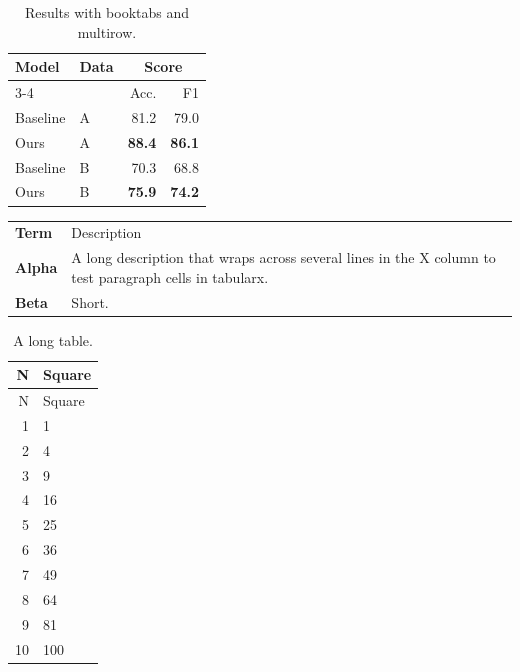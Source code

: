 \documentclass{article}
\begin{document}
\begin{table}[ht]\centering
\caption{Results with booktabs and multirow.}
\begin{tabular}{llrr}
\toprule
\multirow{2}{*}{Model} & \multirow{2}{*}{Data} & \multicolumn{2}{c}{Score} \\
\cmidrule(lr){3-4} & & Acc. & F1 \\
\midrule
Baseline & A & 81.2 & 79.0 \\
Ours & A & \textbf{88.4} & \textbf{86.1} \\
\addlinespace
Baseline & B & 70.3 & 68.8 \\
Ours & B & \textbf{75.9} & \textbf{74.2} \\
\bottomrule
\end{tabular}
\end{table}
\begin{tabularx}{\linewidth}{>{\bfseries}lX}
\rowcolor{gray!20} Term & Description \\
Alpha & A long description that wraps across several lines in the X column to test paragraph cells in tabularx. \\
Beta & Short. \\
\end{tabularx}
\begin{longtable}{rl}
\caption{A long table.}\\ \toprule N & Square \\ \midrule \endfirsthead
\toprule N & Square \\ \midrule \endhead
1 & 1\\ 2 & 4\\ 3 & 9\\ 4 & 16\\ 5 & 25\\ 6 & 36\\ 7 & 49\\ 8 & 64\\ 9 & 81\\ 10 & 100\\
\bottomrule
\end{longtable}
\end{document}
